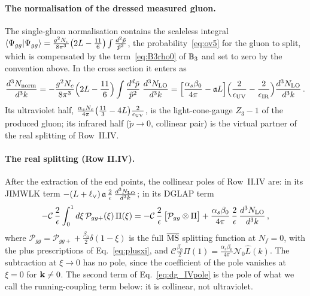 \paragraph{The normalisation of the dressed measured gluon.} The single-gluon normalisation contains the scaleless integral $\braket{\Psi_{gg}|\Psi_{gg}}=\frac{g^2N_c}{8\pi^3}\big(2L-\frac{11}{6}\big)\int\frac{d^2\tilde p}{\tilde p^2}$, the probability~\eqref{eq:ov5} for the gluon to split, which is compensated by the term~\eqref{eq:B3rho0} of $\mathbb{B}_3$ and set to zero by the convention above. In the cross section it enters as
\begin{align}\label{eq:dg_norm}
\frac{d^3N_{\rm norm}}{d^3k}=-\frac{g^2N_c}{8\pi^3}\Big(2L-\frac{11}{6}\Big)\int\frac{d^d\tilde p}{\tilde p^2}\;\frac{d^3N_{\rm LO}}{d^3k}
=\Big[\frac{\alpha_s\beta_0}{4\pi}-\mathfrak aL\Big]\Big(\frac{2}{\epsilon_{\rm UV}}-\frac{2}{\epsilon_{\rm IR}}\Big)\frac{d^3N_{\rm LO}}{d^3k}\,.
\end{align}
Its ultraviolet half, $\frac{\alpha_sN_c}{4\pi}\big(\frac{11}{3}-4L\big)\frac{2}{\epsilon_{\rm UV}}$, is the light-cone-gauge $Z_3-1$ of the produced gluon; its infrared half ($\tilde p\to0$, collinear pair) is the virtual partner of the real splitting of Row~II.IV.

\paragraph{The real splitting (Row II.IV).} After the extraction of the end points, the collinear poles of Row~II.IV are: in its JIMWLK term $-(L+\ell_\vee)\,\mathfrak a\,\frac2\epsilon\,\frac{d^3N_{\rm LO}}{d^3k}$; in its DGLAP term
\begin{align}\label{eq:dg_IVpole}
-\mathcal C\,\frac2\epsilon\int_0^1d\xi\,\mathcal P_{gg+}(\xi)\,\Pi(\xi)=-\mathcal C\,\frac2\epsilon\,\big[\mathcal P_{gg}\otimes\Pi\big]+\frac{\alpha_s\beta_0}{4\pi}\,\frac2\epsilon\,\frac{d^3N_{\rm LO}}{d^3k}\,,
\end{align}
where $\mathcal P_{gg}=\mathcal P_{gg+}+\frac{\beta_0}{2}\delta(1-\xi)$ is the full $\overline{\rm MS}$ splitting function at $N_f=0$, with the plus prescriptions of Eq.~\eqref{eq:plusxi}, and $\mathcal C\frac{\beta_0}{2}\Pi(1)=\frac{\alpha_s\beta_0}{4\pi}\mathcal N_0\widehat L(k)$. The subtraction at $\xi\to0$ has no pole, since the coefficient of the pole vanishes at $\xi=0$ for $\mathbf{k}\neq0$. The second term of Eq.~\eqref{eq:dg_IVpole} is the pole of what we call the running-coupling term below: it is collinear, not ultraviolet.

